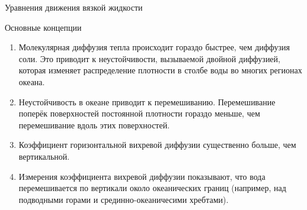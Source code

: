 \begin{chapter}{Уравнения движения вязкой жидкости}
\begin{section}{Основные концепции}
\begin{enumerate}
\item
Молекулярная диффузия тепла происходит гораздо быстрее, чем диффузия соли. 
Это приводит к неустойчивости, вызываемой двойной диффузией, которая
изменяет распределение плотности в столбе воды во многих регионах
океана.

\item
Неустойчивость в океане приводит к перемешиванию. Перемешивание
поперёк поверхностей постоянной плотности гораздо меньше, чем
перемешивание вдоль этих поверхностей.

\item
Коэффициент горизонтальной вихревой диффузии существенно больше, чем
вертикальной.
%


\item
Измерения коэффициента вихревой диффузии показывают, что вода
перемешивается по вертикали около океанических границ (например, над
подводными горами и срединно-океаничесими хребтами). 
%
\end{enumerate} 
\end{section}
\end{chapter}
